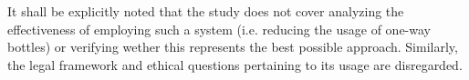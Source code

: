 It shall be explicitly noted that the study does not cover analyzing the effectiveness of employing such a system (i.e. reducing the usage of one-way bottles) or verifying wether this represents the best possible approach. Similarly, the legal framework and ethical questions pertaining to its usage are disregarded.




%
%
%
%
%

